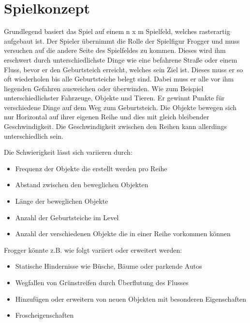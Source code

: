 \documentclass[a4paper,10pt]{report}
\begin{document}
    \section{Spielkonzept}
    {
    	\label{sec:gameconcept}
      	Grundlegend basiert das Spiel auf einem n x m Spielfeld, welches rasterartig aufgebaut ist. 
      	Der Spieler übernimmt die Rolle der Spielfigur Frogger und muss versuchen auf die andere
      	Seite des Spielfeldes zu kommen. Dieses wird ihm erschwert durch unterschiedlichste Dinge wie 
      	eine befahrene Straße oder einem Fluss, bevor er den Geburtsteich erreicht, welches sein Ziel ist.
      	Dieses muss er so oft wiederholen bis alle Geburtsteiche belegt sind. Dabei muss er alle vor ihm
      	liegenden Gefahren ausweichen oder überwinden. Wie zum Beispiel unterschiedlichster Fahrzeuge, Objekte 
     	und Tieren. Er gewinnt Punkte für verschiedene Dinge auf dem Weg zum Geburtsteich. Die Objekte bewegen 
     	sich nur Horizontal auf ihrer eigenen Reihe und dies mit gleich bleibender Geschwindigkeit.
     	Die Geschwindigkeit zwischen den Reihen kann allerdings unterschiedlich sein. 
      
      	\vspace{1cm}
      
      	Die Schwierigkeit lässt sich variieren durch:
      
      	\begin{itemize}
       		\item Frequenz der Objekte die erstellt werden pro Reihe
       		\item Abstand zwischen den beweglichen Objekten
       		\item Länge der beweglichen Objekte
       		\item Anzahl der Geburtsteiche im Level
       		\item Anzahl der verschiedenen Objekte die in einer Reihe vorkommen können
      	\end{itemize}
      
      	\vspace{1cm}
      
      	Frogger könnte z.B. wie folgt variiert oder erweitert werden:
      
      	\begin{itemize}
       		\item Statische Hindernisse wie Büsche, Bäume oder parkende Autos
       		\item Wegfallen von Grünstreifen durch Überflutung des Flusses
       		\item Hinzufügen oder erweitern von neuen Objekten mit besonderen Eigenschaften
       		\item Froscheigenschaften
      	\end{itemize}
      	
    }
  
\end{document}
